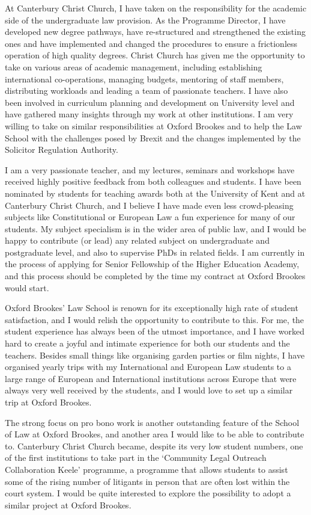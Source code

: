 \documentclass[11pt,a4paper]{moderncv}
\begin{document}
At Canterbury Christ Church, I have taken on the responsibility for the academic side of the undergraduate law provision. As the Programme Director, I have developed new degree pathways, have re-structured and strengthened the existing ones and have implemented and changed the procedures to ensure a frictionless operation of high quality degrees. Christ Church has given me the opportunity to take on various areas of academic management, including establishing international co-operations, managing budgets, mentoring of staff members, distributing workloads and leading a team of passionate teachers. I have also been involved in curriculum planning and development on University level and have gathered many insights through my work at other institutions. I am very willing to take on similar responsibilities at Oxford Brookes and to help the Law School with the challenges posed by Brexit and the changes implemented by the Solicitor Regulation Authority.

I am a very passionate teacher, and my lectures, seminars and workshops have received highly positive feedback from both colleagues and students. I have been nominated by students for teaching awards both at the University of Kent and at Canterbury Christ Church, and I believe I have made even less crowd-pleasing subjects like Constitutional or European Law a fun experience for many of our students. My subject specialism is in the wider area of public law, and I would be happy to contribute (or lead) any related subject on undergraduate and postgraduate level, and also to supervise PhDs in related fields. I am currently in the process of applying for Senior Fellowship of the Higher Education Academy, and this process should be completed by the time my contract at Oxford Brookes would start.

Oxford Brookes' Law School is renown for its exceptionally high rate of student satisfaction, and I would relish the opportunity to contribute to this. For me, the student experience has always been of the utmost importance, and I have worked hard to create a joyful and intimate experience for both our students and the teachers. Besides small things like organising garden parties or film nights, I have organised yearly trips with my International and European Law students to a large range of European and International institutions across Europe that were always very well received by the students, and I would love to set up a similar trip at Oxford Brookes.

The strong focus on pro bono work is another outstanding feature of the School of Law at Oxford Brookes, and another area I would like to be able to contribute to. Canterbury Christ Church became, despite its very low student numbers, one of the first institutions to take part in the `Community Legal Outreach Collaboration Keele' programme, a programme that allows students to assist some of the rising number of litigants in person that are often lost within the court system. I would be quite interested to explore the possibility to adopt a similar project at Oxford Brookes.
\end{document}
